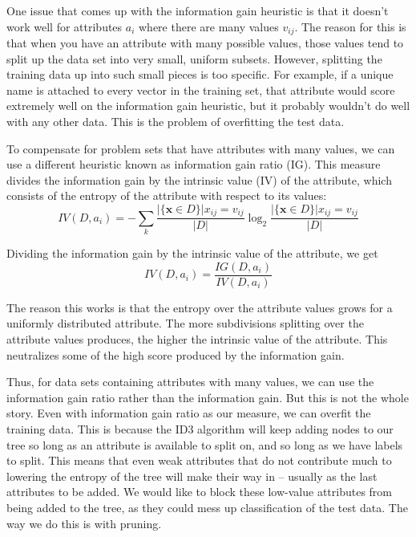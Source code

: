 \documentclass[12pt, letterpaper]{article}
\begin{document}
One issue that comes up with the information gain heuristic is that it doesn't work well for attributes $a_i$ where there are many values $v_{ij}$. The reason for this is that when you have an attribute with many possible values, those values tend to split up the data set into very small, uniform subsets. However, splitting the training data up into such small pieces is too specific. For example, if a unique name is attached to every vector in the training set, that attribute would score extremely well on the information gain heuristic, but it probably wouldn't do well with any other data. This is the problem of overfitting the test data.

To compensate for problem sets that have attributes with many values, we can use a different heuristic known as information gain ratio (IG). This measure divides the information gain by the intrinsic value (IV) of the attribute, which consists of the entropy of the attribute with respect to its values:
\begin{equation}
    IV(D, a_i) = - \sum_k \frac{|\{\boldsymbol{x} \in D\}|{x_{ij} = v_{ij}}}{|D|} \log_2 \frac{|\{\boldsymbol{x} \in D\}|{x_{ij} = v_{ij}}}{|D|}
\end{equation}

Dividing the information gain by the intrinsic value of the attribute, we get
\begin{equation}
    IV(D, a_i) = \frac{IG(D, a_i)}{IV(D, a_i)}
\end{equation}

The reason this works is that the entropy over the attribute values grows for a uniformly distributed attribute. The more subdivisions splitting over the attribute values produces, the higher the intrinsic value of the attribute. This neutralizes some of the high score produced by the information gain.

Thus, for data sets containing attributes with many values, we can use the information gain ratio rather than the information gain. But this is not the whole story. Even with information gain ratio as our measure, we can overfit the training data. This is because the ID3 algorithm will keep adding nodes to our tree so long as an attribute is available to split on, and so long as we have labels to split. This means that even weak attributes that do not contribute much to lowering the entropy of the tree will make their way in -- usually as the last attributes to be added. We would like to block these low-value attributes from being added to the tree, as they could mess up classification of the test data. The way we do this is with pruning.
\end{document}
